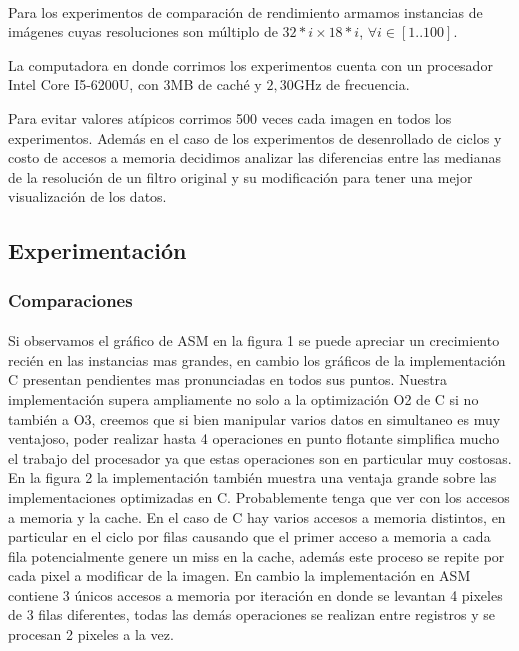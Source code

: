 \documentclass[a4paper]{article}
\begin{document}
\paragraph{} Para los experimentos de comparaci\'on de rendimiento armamos instancias de imágenes cuyas resoluciones son múltiplo de $32*i \times 18*i$, $\forall i \in [1..100]$.


La computadora en donde corrimos los experimentos cuenta con un procesador Intel Core I5-6200U, con 3MB de cach\'e y $2,30$GHz de frecuencia.


Para evitar valores at\'ipicos corrimos 500 veces cada imagen en todos los experimentos. Adem\'as en el caso de los experimentos de desenrollado de ciclos y costo de accesos a memoria decidimos analizar las diferencias entre las medianas de la resoluci\'on de un filtro original y su modificaci\'on para tener una mejor visualizaci\'on de los datos.

\subsection{Experimentaci\'on}

\subsubsection{Comparaciones}

\paragraph{} Si observamos el gr\'afico de ASM en la figura 1 se puede apreciar un crecimiento recién en las instancias mas grandes, en cambio los gr\'aficos de la implementaci\'on C presentan pendientes mas pronunciadas en todos sus puntos. Nuestra implementaci\'on supera ampliamente no solo a la optimizaci\'on O2 de C si no también a O3, creemos que si bien manipular varios datos en simultaneo es muy ventajoso, poder realizar hasta 4 operaciones en punto flotante simplifica mucho el trabajo del procesador ya que estas operaciones son en particular muy costosas.\\
 
 En la figura 2 la implementaci\'on también muestra una ventaja grande sobre las implementaciones optimizadas en C. Probablemente tenga que ver con los accesos a memoria y la cache. En el caso de C hay varios accesos a memoria distintos, en particular en el ciclo por filas causando que el primer acceso a memoria a cada fila potencialmente genere un miss en la cache, adem\'as este proceso se repite por cada pixel a modificar de la imagen. En cambio la implementaci\'on en ASM contiene 3 \'unicos accesos a memoria por iteraci\'on en donde se levantan 4 pixeles de 3 filas diferentes, todas las dem\'as operaciones se realizan entre registros y se procesan 2 pixeles a la vez.  \\
\end{document}
